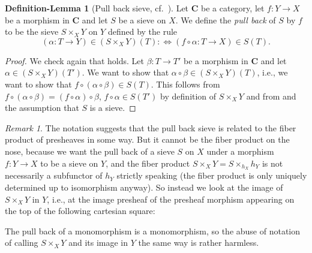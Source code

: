 \documentclass[12pt,reqno,a4paper]{amsart}
\theoremstyle{plain}
\theoremstyle{definition}
\newtheorem{defnlm}[thm]{Definition-Lemma}
\theoremstyle{remark}
\newtheorem{rem}[thm]{Remark}
\begin{document}
\begin{defnlm}[Pull back sieve, {cf.~\cite[\href{https://stacks.math.columbia.edu/tag/00Z2}{Tag 00Z2}]{stacks-project}}]\label{defnlm:pullback}
  Let $\mathbf{C}$ be a category, let $f \colon Y \to X$  be a morphism in $\mathbf{C}$ and let $S$ be a sieve on $X$.
  We define the \textit{pull back} of $S$ by $f$ to be the sieve $S \times_{X} Y$ on $Y$ defined by the rule
  \[ (\alpha \colon T \to Y) \in (S\times_{X} Y)(T) : \Leftrightarrow (f \circ \alpha \colon T \to X) \in S(T). \]
  \begin{proof}
    We check again that  holds.
    Let $\beta \colon T \to T'$ be a morphism in $\mathbf{C}$ and let $\alpha \in (S\times_{X} Y)(T')$.
    We want to show that $\alpha \circ \beta \in (S \times_{X} Y)(T)$, i.e., we want to show that $f \circ (\alpha \circ \beta) \in S(T)$.
    This follows from $f \circ (\alpha \circ \beta) = (f \circ \alpha) \circ \beta$, $f \circ \alpha \in S(T')$ by definition of $S \times_{X} Y$ and from  and the assumption that $S$ is a sieve.
  \end{proof}
\end{defnlm}

\begin{rem}
  The notation suggests that the pull back sieve is related to the fiber product of presheaves in some way.
  But it cannot be the fiber product on the nose, because we want the pull back of a sieve $S$ on $X$ under a morphism $f \colon Y \to X$ to be a sieve on $Y$, and the fiber product $S \times_{X} Y = S \times_{h_{X}} h_{Y}$ is not necessarily a subfunctor of $h_{Y}$ strictly speaking (the fiber product is only uniquely determined up to isomorphism anyway).
  So instead we look at the image of $S \times_{X} Y$ in $Y$, i.e., at the image presheaf of the presheaf morphism appearing on the top of the following cartesian square:
  \begin{center}
  \end{center}
  The pull back of a monomorphism is a monomorphism, so the abuse of notation of calling $S \times_{X} Y$ and its image in $Y$ the same way is rather harmless.
\end{rem}
\end{document}
